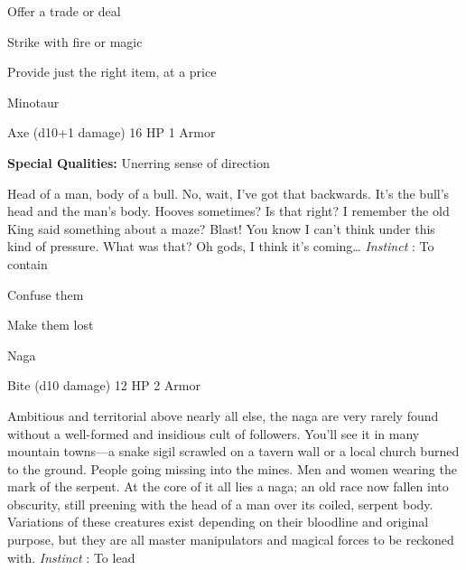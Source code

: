 \startitemize[1,packed]

\item Offer a trade or deal

 
\item Strike with fire or magic

 
\item Provide just the right item, at a price


\stopitemize
 
\startMonsterName
Minotaur	 
\stopMonsterName
 

Axe (d10+1 damage)	16 HP	1 Armor

 


 
\startMonsterQualities
{\bf Special Qualities:}  Unerring sense of direction
\stopMonsterQualities
 
\startMonsterDescription
Head of a man, body of a bull. No, wait, I’ve got that backwards. It’s the bull’s head and the man’s body. Hooves sometimes? Is that right? I remember the old King said something about a maze? Blast! You know I can’t think under this kind of pressure. What was that? Oh gods, I think it’s coming… {\em Instinct} : To contain
\stopMonsterDescription
 
\startitemize[1,packed]

\item Confuse them

 
\item Make them lost


\stopitemize
 
\startMonsterName
Naga	 
\stopMonsterName
 

Bite (d10 damage)	12 HP	2 Armor

 


 
\startMonsterDescription
Ambitious and territorial above nearly all else, the naga are very rarely found without a well-formed and insidious cult of followers. You’ll see it in many mountain towns—a snake sigil scrawled on a tavern wall or a local church burned to the ground. People going missing into the mines. Men and women wearing the mark of the serpent. At the core of it all lies a naga; an old race now fallen into obscurity, still preening with the head of a man over its coiled, serpent body. Variations of these creatures exist depending on their bloodline and original purpose, but they are all master manipulators and magical forces to be reckoned with. {\em Instinct} : To lead
\stopMonsterDescription
 
